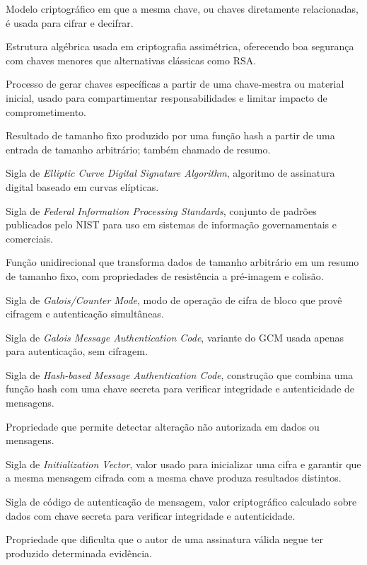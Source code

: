 \begin{description}[
  font=\normalfont\bfseries,
  style=multiline,
  leftmargin=5.6cm,
  labelwidth=4.9cm,
  labelsep=0.35cm,
  itemsep=0.55\baselineskip
]
  \item[Criptografia simétrica] Modelo criptográfico em que a mesma chave, ou chaves diretamente relacionadas, é usada para cifrar e decifrar.
  \item[Curva elíptica] Estrutura algébrica usada em criptografia assimétrica, oferecendo boa segurança com chaves menores que alternativas clássicas como RSA.
  \item[Derivação de chaves] Processo de gerar chaves específicas a partir de uma chave-mestra ou material inicial, usado para compartimentar responsabilidades e limitar impacto de comprometimento.
  \item[Digest] Resultado de tamanho fixo produzido por uma função hash a partir de uma entrada de tamanho arbitrário; também chamado de resumo.
  \item[ECDSA] Sigla de \textit{Elliptic Curve Digital Signature Algorithm}, algoritmo de assinatura digital baseado em curvas elípticas.
  \item[FIPS] Sigla de \textit{Federal Information Processing Standards}, conjunto de padrões publicados pelo NIST para uso em sistemas de informação governamentais e comerciais.
  \item[Função hash criptográfica] Função unidirecional que transforma dados de tamanho arbitrário em um resumo de tamanho fixo, com propriedades de resistência a pré-imagem e colisão.
  \item[GCM] Sigla de \textit{Galois/Counter Mode}, modo de operação de cifra de bloco que provê cifragem e autenticação simultâneas.
  \item[GMAC] Sigla de \textit{Galois Message Authentication Code}, variante do GCM usada apenas para autenticação, sem cifragem.
  \item[HMAC] Sigla de \textit{Hash-based Message Authentication Code}, construção que combina uma função hash com uma chave secreta para verificar integridade e autenticidade de mensagens.
  \item[Integridade] Propriedade que permite detectar alteração não autorizada em dados ou mensagens.
  \item[IV] Sigla de \textit{Initialization Vector}, valor usado para inicializar uma cifra e garantir que a mesma mensagem cifrada com a mesma chave produza resultados distintos.
  \item[MAC] Sigla de código de autenticação de mensagem, valor criptográfico calculado sobre dados com chave secreta para verificar integridade e autenticidade.
  \item[Não repúdio] Propriedade que dificulta que o autor de uma assinatura válida negue ter produzido determinada evidência.

\end{description}
